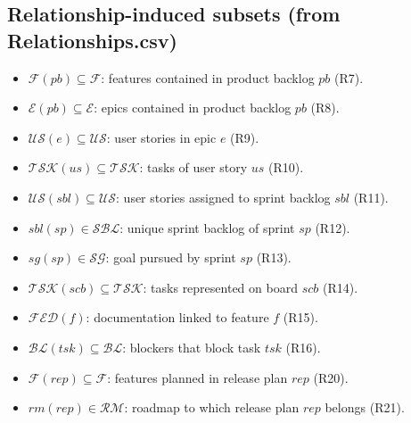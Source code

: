 \documentclass[11pt,a4paper]{article}
\begin{document}
\subsection*{Relationship-induced subsets (from Relationships.csv)}
\begin{itemize}[leftmargin=2em]
  \item $\mathcal{F}(pb) \subseteq \mathcal{F}$: features contained in product backlog $pb$ (R7).
  \item $\mathcal{E}(pb) \subseteq \mathcal{E}$: epics contained in product backlog $pb$ (R8).
  \item $\mathcal{US}(e) \subseteq \mathcal{US}$: user stories in epic $e$ (R9).
  \item $\mathcal{TSK}(us) \subseteq \mathcal{TSK}$: tasks of user story $us$ (R10).
  \item $\mathcal{US}(sbl) \subseteq \mathcal{US}$: user stories assigned to sprint backlog $sbl$ (R11).
  \item $sbl(sp) \in \mathcal{SBL}$: unique sprint backlog of sprint $sp$ (R12).
  \item $sg(sp) \in \mathcal{SG}$: goal pursued by sprint $sp$ (R13).
  \item $\mathcal{TSK}(scb) \subseteq \mathcal{TSK}$: tasks represented on board $scb$ (R14).
  \item $\mathcal{FED}(f)$: documentation linked to feature $f$ (R15).
  \item $\mathcal{BL}(tsk) \subseteq \mathcal{BL}$: blockers that block task $tsk$ (R16).
  \item $\mathcal{F}(rep) \subseteq \mathcal{F}$: features planned in release plan $rep$ (R20).
  \item $rm(rep) \in \mathcal{RM}$: roadmap to which release plan $rep$ belongs (R21).
\end{itemize}
\end{document}
